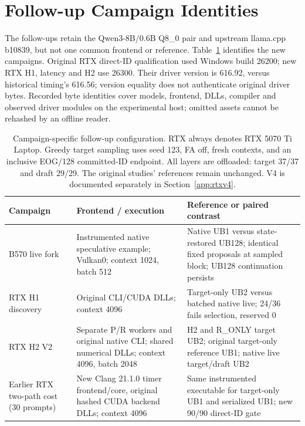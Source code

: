 \section{Follow-up Campaign Identities}
\label{app:followupconfigs}

The follow-ups retain the Qwen3-8B/0.6B Q8\_0 pair and upstream llama.cpp b10839, but not one common frontend or reference. Table~\ref{tab:followupconfigs} identifies the new campaigns. Original RTX direct-ID qualification used Windows build 26200; new RTX H1, latency and H2 use 26300. Their driver version is 616.92, versus historical timing's 616.56; version equality does not authenticate original driver bytes. Recorded byte identities cover models, frontend, DLLs, compiler and observed driver modules on the experimental host; omitted assets cannot be rehashed by an offline reader.

\begin{table}[t]
\caption{Campaign-specific follow-up configuration. RTX always denotes RTX 5070 Ti Laptop. Greedy target sampling uses seed 123, FA off, fresh contexts, and an inclusive EOG/128 committed-ID endpoint. All layers are offloaded: target 37/37 and draft 29/29. The original studies' references remain unchanged. V4 is documented separately in Section~\ref{app:rtxv4}.}
\label{tab:followupconfigs}
\centering
\begin{tabular}{>{\raggedright\arraybackslash}p{1.15in}>{\raggedright\arraybackslash}p{2.15in}>{\raggedright\arraybackslash}p{2.45in}}
\toprule
Campaign & Frontend / execution & Reference or paired contrast \\
\midrule
B570 live fork & Instrumented native speculative example; Vulkan0; context 1024, batch 512 & Native UB1 versus state-restored UB128; identical fixed proposals at sampled block; UB128 continuation persists \\
RTX H1 discovery & Original CLI/CUDA DLLs; context 4096 & Target-only UB2 versus batched native live; 24/36 fails selection, reserved 0 \\
RTX H2 V2 & Separate P/R workers and original native CLI; shared numerical DLLs; context 4096, batch 2048 & H2 and R\_ONLY target UB2; original target-only reference UB1; native live target/draft UB2 \\
Earlier RTX two-path cost (30 prompts) & New Clang 21.1.0 timer frontend/core, original hashed CUDA backend DLLs; context 4096 & Same instrumented executable for target-only UB1 and serialized UB1; new 90/90 direct-ID gate \\
\bottomrule
\end{tabular}
\end{table}

